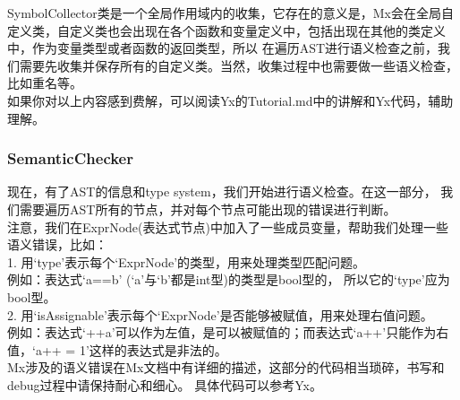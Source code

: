 SymbolCollector类是一个全局作用域内的收集，它存在的意义是，Mx会在全局自定义类，自定义类也会出现在各个函数和变量定义中，包括出现在其他的类定义中，作为变量类型或者函数的返回类型，所以
在遍历AST进行语义检查之前，我们需要先收集并保存所有的自定义类。当然，收集过程中也需要做一些语义检查，比如重名等。 \\

如果你对以上内容感到费解，可以阅读Yx的Tutorial.md中的讲解和Yx代码，辅助理解。

\subsubsection{SemanticChecker}
现在，有了AST的信息和type system，我们开始进行语义检查。在这一部分，
我们需要遍历AST所有的节点，并对每个节点可能出现的错误进行判断。\\

注意，我们在ExprNode(表达式节点)中加入了一些成员变量，帮助我们处理一些语义错误，比如： \\

1. 用`type'表示每个`ExprNode'的类型，用来处理类型匹配问题。\\
例如：表达式`a==b' (`a'与`b'都是int型)的类型是bool型的，
所以它的`type'应为bool型。\\

2. 用`isAssignable'表示每个`ExprNode'是否能够被赋值，用来处理右值问题。\\
例如：表达式`++a'可以作为左值，是可以被赋值的；而表达式`a++'只能作为右值，`a++ = 1'这样的表达式是非法的。\\

Mx涉及的语义错误在Mx文档中有详细的描述，这部分的代码相当琐碎，书写和debug过程中请保持耐心和细心。
具体代码可以参考Yx。





